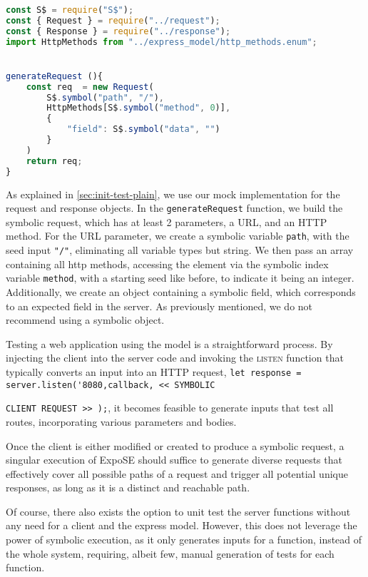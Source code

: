 \begin{lstlisting}[language=JavaScript, float, caption={[Example Client]An Example Client for symbolic requests}, label={lst:client-example}]
const S$ = require("S$");
const { Request } = require("../request");
const { Response } = require("../response");
import HttpMethods from "../express_model/http_methods.enum";


generateRequest (){
    const req  = new Request(
        S$.symbol("path", "/"),
        HttpMethods[S$.symbol("method", 0)],
        {
            "field": S$.symbol("data", "")
        }
    )
    return req;
}
\end{lstlisting}
As explained in \autoref{sec:init-test-plain}, we use our mock implementation for the request and response objects. In the \lstinline{generateRequest} function, we build the symbolic request, which has at least 2 parameters, a URL, and an HTTP method. For the URL parameter, we create a symbolic variable \lstinline{path}, with the seed input \lstinline{"/"}, eliminating all variable types but string. 
We then pass an array containing all http methods, accessing the element via the symbolic index variable \lstinline{method}, with a starting seed like before, to indicate it being an integer.
Additionally, we create an object containing a symbolic field, which corresponds to an expected field in the server. As previously mentioned, we do not recommend using a symbolic object.


Testing a web application using the model is a straightforward process.
By injecting the client into the server code and invoking the \textsc{listen}
function  that typically converts an input into an HTTP request, \lstinline{let response = server.listen('8080,callback, << SYMBOLIC } \par\noindent\lstinline{CLIENT REQUEST >> );}, it becomes feasible to generate inputs that test all routes, incorporating various parameters and bodies.


Once the client is either modified or created to produce a symbolic request, 
a singular execution of ExpoSE should suffice to generate diverse requests that effectively cover all possible paths of a request and trigger all potential unique responses, as long as it is a distinct and reachable path.  

Of course, there also exists the option to unit test the server functions without any need for a client and the express model. However, this does not leverage the power of symbolic execution, as it only generates inputs for a function, instead of the whole system, requiring, albeit few, manual generation of tests for each function.

